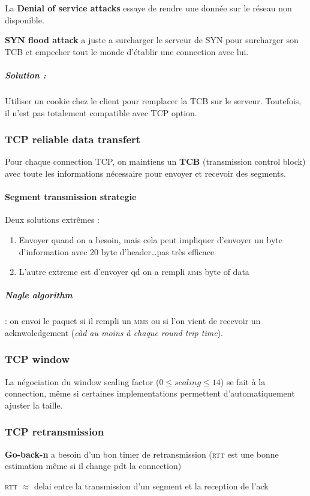 La \textbf{Denial of service attacks} essaye de rendre une donnée 
sur le réseau non disponible.

\textbf{SYN flood attack} a juste a surcharger le serveur de SYN
pour surcharger son TCB et empecher tout le monde d'établir une connection avec
lui.

\subparagraph{Solution :} Utiliser un cookie chez le client
pour remplacer la TCB sur le serveur. Toutefois, il n'est pas
totalement compatible avec TCP option.

\subsubsection{TCP reliable data transfert}

Pour chaque connection TCP, on maintiens un \textbf{TCB} (transmission control block)
avec toute les informations nécessaire pour envoyer et recevoir des segments.

\paragraph{Segment transmission strategie}

Deux solutions extrêmes :
\begin{enumerate}
    \item Envoyer quand on a besoin, mais cela peut impliquer d'envoyer
        un byte d'information avec 20 byte d'header\ldots pas très efficace
    \item L'autre extreme est d'envoyer qd on a rempli \textsc{mms} byte of data
\end{enumerate}

\subparagraph{Nagle  algorithm}  :   on  envoi  le  paquet   si  il  rempli
un  \textsc{mms}  ou  si  l'on  vient  de  recevoir  un  acknwoledgement
(\textit{càd au moins à chaque round trip time}).

\subsubsection{TCP window}

La négociation du  window scaling factor ($0 \leq scaling  \leq 14$) se
fait  à la  connection, même  si certaines  implementations permettent
d'automatiquement ajuster la taille.

\subsubsection{TCP retransmission}
\textbf{Go-back-n} a besoin d'un bon timer de retransmission (\textsc{rtt} est une
bonne estimation même si il change pdt la connection)
\begin{center}
\textsc{rtt} $\approx$ delai entre la transmission d'un segment et la reception de l'ack
\end{center}

